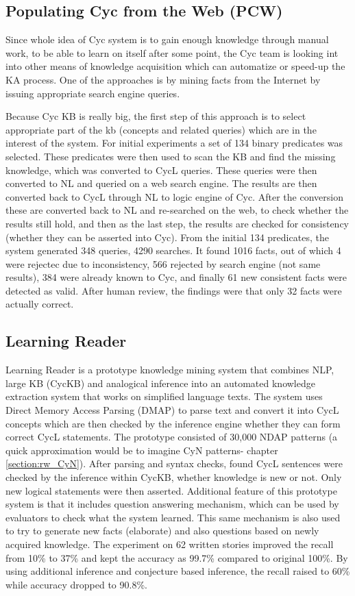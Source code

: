\subsection{Populating Cyc from the Web (PCW)}
\label{section:rw_PCW}
Since whole idea of Cyc system is to gain enough knowledge through manual work,
to be able to learn on itself after some point, the Cyc team is looking int into 
other means of knowledge acquisition which can automatize or speed-up the KA process.
One of the approaches is by mining facts from the Internet by issuing appropriate
search engine queries\parencite{Matuszek2004}.

Because Cyc KB is really big, the first step of this approach is to select appropriate
part of the kb (concepts and related queries) which are in the interest of the system.
For initial experiments  a set of 134 binary predicates was selected. These predicates
were then used to scan the KB and find the missing knowledge, which was converted to 
CycL queries. 
These queries were then converted to NL and queried on a web search engine. The results
are then converted back to CycL through NL to logic engine of Cyc. After the conversion
these are converted back to NL and re-searched on the web, to check whether the results
still hold, and then as the last step, the results are checked for consistency 
(whether they can be asserted into Cyc). From the initial 134 predicates, the system
generated 348 queries, 4290 searches. It found 1016 facts, out of which 4 were rejectec
due to inconsistency, 566 rejected by search engine (not same results), 384 were 
already known to Cyc, and finally 61 new consistent facts were detected as valid.
After human review, the findings were that only 32 facts were actually correct.

\subsection{Learning Reader}
\label{section:rw_LR}
Learning Reader\parencite{Forbus2007} is a prototype knowledge mining system
that combines NLP, large KB (CycKB) and analogical inference into an automated 
knowledge extraction system that works on simplified language texts. The system
uses Direct Memory Access Parsing (DMAP\parencite{Martin1986}) to parse text
and convert it into CycL concepts which are then checked by the inference engine
whether they can form correct CycL statements. The prototype consisted of
30,000 NDAP patterns (a quick approximation would be to imagine CyN patterns-
chapter \ref{section:rw_CyN}). After parsing and syntax checks, found CycL 
sentences were checked by the inference within CycKB, whether knowledge is new
or not. Only new logical statements were then asserted. Additional feature of
this prototype system is that it includes question answering mechanism, which 
can be used by evaluators to check what the system learned. This same mechanism
is also used to try to generate new facts (elaborate) and also questions based
on newly acquired knowledge. The experiment on 62 written stories improved the
recall from 10\% to 37\% and kept the accuracy as 99.7\% compared to original 
100\%. By using additional inference and conjecture based inference, the recall
raised to 60\% while accuracy dropped to 90.8\%.

